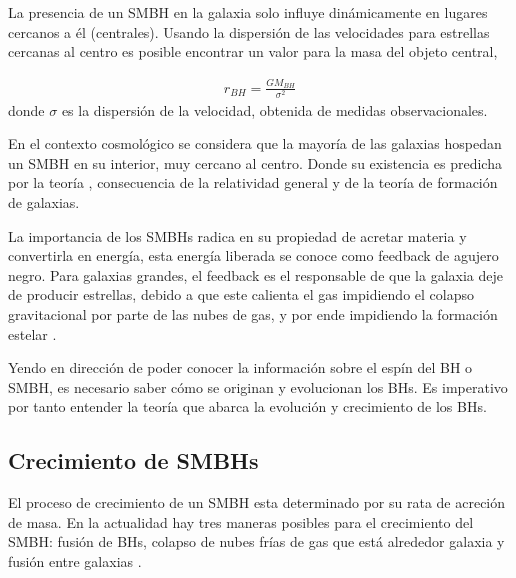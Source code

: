 La presencia de un SMBH en la galaxia solo influye dinámicamente en lugares cercanos a él (centrales). Usando la dispersión de las velocidades para estrellas cercanas al centro es posible encontrar un valor para la masa del objeto central, 

\begin{align}
    r_{BH}=\frac{GM_{BH}}{\sigma^{2}}
\end{align}
donde $\sigma$ es la dispersión de la velocidad, obtenida de medidas observacionales. 

En el contexto cosmológico se considera que la mayoría de las galaxias hospedan un SMBH en su interior, muy cercano al centro. Donde su existencia es predicha por la teoría \cite{schneider2006},  consecuencia de la relatividad general y de la teoría de formación de galaxias. 

La importancia de los SMBHs radica en su propiedad de acretar materia y convertirla en energía, esta energía liberada se conoce como feedback de agujero negro. Para galaxias grandes, el feedback es el responsable de que la galaxia deje de producir estrellas, debido a que este calienta el gas  impidiendo el colapso gravitacional por parte de las nubes de gas, y por ende impidiendo la formación estelar \cite{croton2006}.

Yendo en dirección de poder conocer la información sobre el espín del BH o SMBH, es necesario saber cómo se originan y evolucionan los BHs. Es imperativo por tanto entender la teoría que abarca la evolución y crecimiento de los BHs.
\subsection{Crecimiento de SMBHs}
\label{subsec: Crecimiento_SMBHs}

El proceso de crecimiento de un SMBH esta determinado por su rata de acreción de masa. En la actualidad hay tres maneras posibles para el crecimiento del SMBH: fusión de BHs, colapso de nubes frías de gas que está alrededor galaxia y fusión entre galaxias \cite{fanidakis2011}.
